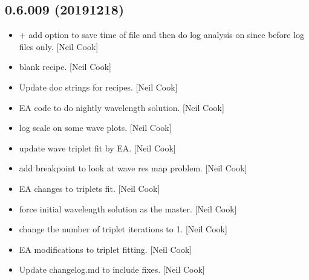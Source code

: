 \documentclass[a4paper,10pt,english]{report}
\begin{document}
\subsection{0.6.009 (2019\sphinxhyphen{}12\sphinxhyphen{}18)}
\label{\detokenize{misc/changelog:id28}}\begin{itemize}
\item {} 
 +  \sphinxhyphen{} add option to save time of
file and then do log analysis on \textendash{}since \textendash{}before log files only.
{[}Neil Cook{]}

\item {} 
 \sphinxhyphen{} blank recipe. {[}Neil Cook{]}

\item {} 
Update doc strings for recipes. {[}Neil Cook{]}

\item {} 
 \sphinxhyphen{} EA code to do nightly
wavelength solution. {[}Neil Cook{]}

\item {} 
 \sphinxhyphen{} log scale on some wave plots. {[}Neil Cook{]}

\item {} 
 \sphinxhyphen{} update wave triplet fit by EA. {[}Neil Cook{]}

\item {} 
 \sphinxhyphen{} add breakpoint to look at wave res map
problem. {[}Neil Cook{]}

\item {} 
 \sphinxhyphen{} EA changes to triplets fit. {[}Neil Cook{]}

\item {} 
 \sphinxhyphen{} force initial wavelength solution
as the master. {[}Neil Cook{]}

\item {} 
 \sphinxhyphen{} change the number of
triplet iterations to 1. {[}Neil Cook{]}

\item {} 
 \sphinxhyphen{} EA modifications to triplet fitting. {[}Neil
Cook{]}

\item {} 
Update changelog.md to include  fixes. {[}Neil Cook{]}

\end{itemize}
\end{document}
